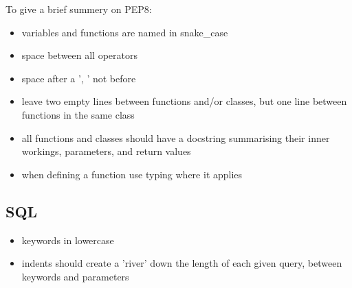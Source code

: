 \noindent
To give a brief summery on PEP8:
\begin{itemize}
    \item variables and functions are named in snake\_case
    \item space between all operators
    \item space after a ', ' not before
    \item leave two empty lines between functions and/or classes, but one line between functions in the same class
    \item all functions and classes should have a docstring summarising their inner workings, parameters, and return values
    \item when defining a function use typing where it applies
\end{itemize}

\subsection{SQL}
\begin{itemize}
    \item keywords in lowercase
    \item indents should create a 'river' down the length of each given query, between keywords and parameters
\end{itemize}